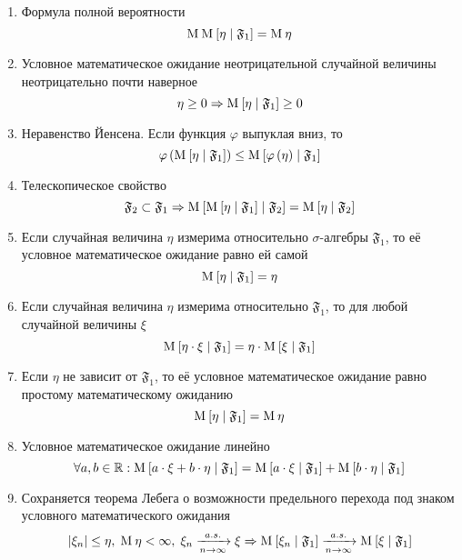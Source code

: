 \begin{enumerate}[label= \Roman*]
  \item\label{conditionalExpectationProperty:totalProbability}
      Формула полной вероятности \cite[стр.~144]{BorovkovMS}
      $$\operatorname{M}_{} \operatorname{M}_{} \left[  \eta \;\middle|\; \mathfrak{F}_1  \right] = \operatorname{M}_{} \eta$$
  \item Условное математическое ожидание неотрицательной случайной величины
      неотрицательно почти наверное
      $$\eta \ge 0
      \Rightarrow \operatorname{M}_{} \left[  \eta \;\middle|\; \mathfrak{F}_1  \right] \ge 0$$
  \item\label{conditionalExpectationProperty:Jensen}
      Неравенство Йенсена. Если функция $\varphi$ выпуклая вниз, то
      $$\varphi\left( \operatorname{M}_{} \left[  \eta \;\middle|\; \mathfrak{F}_1  \right] \right)
      \le \operatorname{M}_{} \left[ \varphi\left( \eta \right) \;\middle|\; \mathfrak{F}_1 \right]$$
  \item Телескопическое свойство
      $$\mathfrak{F}_2 \subset \mathfrak{F}_1 \Rightarrow
      \operatorname{M}_{} \left[  \operatorname{M}_{} \left[ \eta \;\middle|\; \mathfrak{F}_1 \right] \;\middle|\; \mathfrak{F}_2 \right]
      = \operatorname{M}_{} \left[  \eta \;\middle|\; \mathfrak{F}_2  \right]$$
  \item\label{conditionalExpectationProperty:measurableRandomVariable}
      Если случайная величина $\eta$ измерима
      относительно $\sigma$-алгебры $\mathfrak{F}_1$,
      то её условное математическое ожидание равно ей самой
      $$\operatorname{M}_{} \left[  \eta \;\middle|\; \mathfrak{F}_1  \right] = \eta$$
  \item\label{conditionalExpectationProperty:measurableProduct}
      Если случайная величина $\eta$ измерима
      относительно $\mathfrak{F}_1$, то для любой случайной величины $\xi$
      $$\operatorname{M}_{} \left[  \eta \cdot \xi \;\middle|\; \mathfrak{F}_1  \right]
      = \eta \cdot \operatorname{M}_{} \left[  \xi \;\middle|\; \mathfrak{F}_1  \right]$$
  \item\label{conditionalExpectationProperty:independence}
      Если $\eta$ не зависит от $\mathfrak{F}_1$,
      то её условное математическое ожидание
      равно простому математическому ожиданию
      \begin{equation*}
        \operatorname{M}_{} \left[  \eta \;\middle|\; \mathfrak{F}_1  \right] = \operatorname{M}_{} \eta
      \end{equation*}
  \item\label{conditionalExpectationProperty:linearity}
      Условное математическое ожидание линейно
      $$\forall a, b \in \mathbb{R}:
      \operatorname{M}_{} \left[ a \cdot \xi + b \cdot \eta \;\middle|\; \mathfrak{F}_1 \right]
      = \operatorname{M}_{} \left[ a \cdot \xi \;\middle|\; \mathfrak{F}_1 \right]
    + \operatorname{M}_{} \left[ b \cdot \eta \;\middle|\; \mathfrak{F}_1 \right]$$
  \item Сохраняется теорема Лебега о возможности предельного перехода
      под знаком условного математического ожидания
      \cite[стр.~302]{KolmogorovFA} \cite[стр.~272]{Shiryayev1}
      $$\left|\xi_n\right| \le \eta,
      \;\operatorname{M}_{} \eta < \infty,
      \;\xi_n \xrightarrow[n\to\infty]{a.s.} \xi
      \Rightarrow
      \operatorname{M}_{} \left[ \xi_n \;\middle|\; \mathfrak{F}_1 \right]
      \xrightarrow[n\to\infty]{a.s.} \operatorname{M}_{} \left[ \xi \;\middle|\; \mathfrak{F}_1 \right]$$
\end{enumerate}

